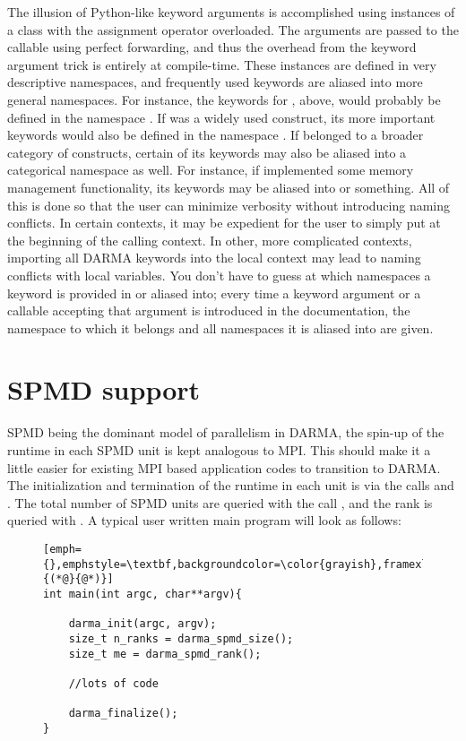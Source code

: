 The illusion of Python-like keyword arguments is accomplished using  instances
of a class with the assignment operator overloaded.  The arguments are passed to the 
callable using perfect forwarding, and thus the overhead from the keyword argument 
trick is entirely at compile-time.  These instances are defined in very descriptive
namespaces, and frequently used keywords are aliased into more general namespaces.  For
instance, the keywords for , above, would probably be defined in the 
namespace .  If  was a 
widely used construct, its more important keywords would also be defined in the namespace
.  If  belonged to a broader category of 
constructs, certain of its keywords may also be aliased into a categorical namespace
as well.  For instance, if  implemented some memory management functionality,
its keywords may be aliased into  or 
something.  All of this is done so that the user can minimize verbosity without introducing
naming conflicts.  In certain contexts, it may be expedient for the user to simply
put  at the beginning of the calling context.  In other,
more complicated contexts, importing all DARMA keywords into the local context may
lead to naming conflicts with local variables.  You don't have to guess at which namespaces
a keyword is provided in or aliased into; every time a keyword argument or a callable
accepting that argument is introduced in the documentation, the namespace to which 
it belongs and all namespaces it is aliased into are given.



\section{SPMD support}
\label{sec:spmd}
SPMD being the dominant model of parallelism in DARMA, the spin-up of the runtime in each SPMD unit is 
kept analogous to MPI. This should make it a little easier for existing MPI based application codes to transition 
to DARMA. The initialization and termination of the runtime in each unit is via the calls 
and . The total number of SPMD units are queried with the call ,
and the rank is queried with . A typical user written main program will look as follows:
\begin{figure}[h!]
\begin{lstlisting}[emph={},emphstyle=\textbf,backgroundcolor=\color{grayish},framexleftmargin=1em,numbers=left,numberstyle=\tiny,numbersep=5pt,escapeinside={(*@}{@*)}]
int main(int argc, char**argv){

	darma_init(argc, argv);
	size_t n_ranks = darma_spmd_size();
	size_t me = darma_spmd_rank();

	//lots of code

	darma_finalize();
}
\end{lstlisting}
\end{figure}

